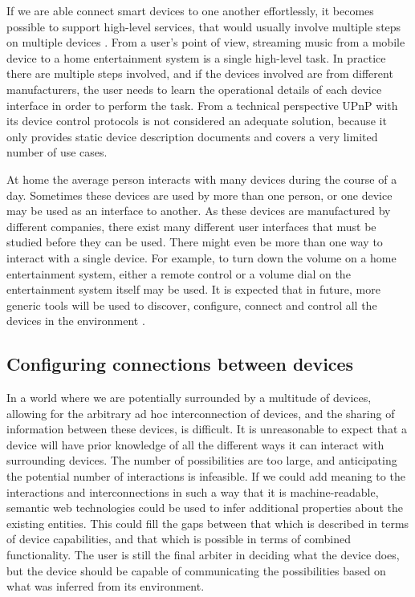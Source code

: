 If we are able connect smart devices to one another effortlessly, it becomes possible to support high-level services, that would usually involve multiple steps on multiple devices \cite{Rich2009}. From a user's point of view, streaming music from a mobile device to a home entertainment system is a single high-level task. In practice there are multiple steps involved, and if the devices involved are from different manufacturers, the user needs to learn the operational details of each device interface in order to perform the task. From a technical perspective \ac{UPnP} with its device control protocols \cite{uPnPDCP} is not considered an adequate solution, because it only provides static device description documents and covers a very limited number of use cases. %

At home the average person interacts with many devices during the course of a day. Sometimes these devices are used by more than one person, or one device may be used as an interface to another. As these devices are manufactured by different companies, there exist many different user interfaces that must be studied before they can be used. There might even be more than one way to interact with a single device. For example, to turn down the volume on a home entertainment system, either a remote control or a volume dial on the entertainment system itself may be used. It is expected that in future, more generic tools will be used to discover, configure, connect and control all the devices in the environment \cite{Newman2002}. 

\subsection{Configuring connections between devices}

In a world where we are potentially surrounded by a multitude of devices, allowing for the arbitrary ad hoc interconnection of devices, and the sharing of information between these devices, is difficult. It is unreasonable to expect that a device will have prior knowledge of all the different ways it can interact with surrounding devices. The number of possibilities are too large, and anticipating the potential number of interactions is infeasible. If we could add meaning to the interactions and interconnections in such a way that it is machine-readable, semantic web technologies could be used to infer additional properties about the existing entities. This could fill the gaps between that which is described in terms of device capabilities, and that which is possible in terms of combined functionality. The user is still the final arbiter in deciding what the device does, but the device should be capable of communicating the possibilities based on what was inferred from its environment. 

